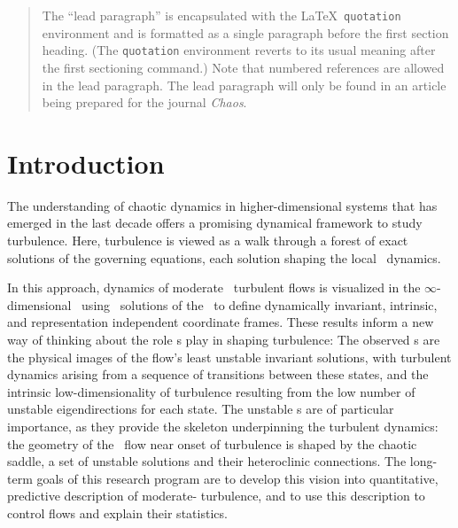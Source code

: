 
\begin{quotation}
The ``lead paragraph'' is encapsulated with the \LaTeX\
\verb+quotation+ environment and is formatted as a single paragraph before the first section heading.
(The \verb+quotation+ environment reverts to its usual meaning after the first sectioning command.)
Note that numbered references are allowed in the lead paragraph.
%
The lead paragraph will only be found in an article being prepared for the journal \textit{Chaos}.
\end{quotation}


\section{Introduction}
\label{s:intro}



The understanding of chaotic dynamics in higher-dimensional systems that
has emerged in the last decade offers a promising dynamical framework to
study turbulence. Here, turbulence is viewed as a walk through a forest
of exact solutions of the governing equations, each solution shaping the
local \statesp\ dynamics.

In this approach, dynamics of moderate \Reynolds\ turbulent flows is
visualized in the $\infty$-dimensional \stateDsp\  using \eqv\ solutions
of the \NSe\ to define dynamically invariant, intrinsic, and
representation independent coordinate frames.
These results inform a new way of thinking about the role {\recurrStr s}
play in shaping turbulence:
The observed {\cohStr s} are the physical images of the flow's
least unstable invariant solutions, with
turbulent dynamics arising from a sequence of transitions between
these states, and
the intrinsic low-dimensionality of turbulence resulting from the low
number of unstable eigendirections for each state.
The unstable \po s are of particular
importance, as they provide the skeleton underpinning the
turbulent dynamics: the geometry of the \statesp\ flow
near onset of turbulence is shaped by the chaotic saddle, a set of
unstable solutions and their heteroclinic connections.
The long-term goals of this research program are to develop this vision
into quantitative,  predictive description of moderate-{\Reynolds}
turbulence, and to use this description to control flows and explain their statistics.

